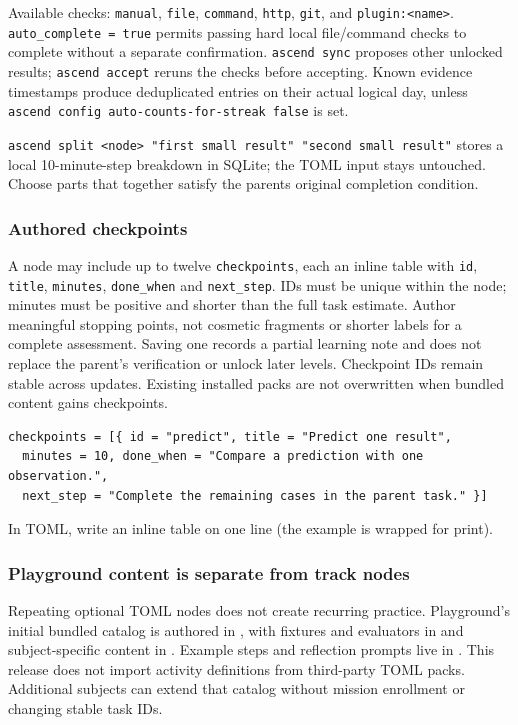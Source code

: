 Available checks: \texttt{manual}, \texttt{file}, \texttt{command},
\texttt{http}, \texttt{git}, and
\texttt{plugin:\textless{}name\textgreater{}}.
\texttt{auto\_complete = true} permits passing hard local file/command
checks to complete without a separate confirmation.
\texttt{ascend sync} proposes other unlocked results;
\texttt{ascend accept} reruns the checks before accepting. Known
evidence timestamps produce deduplicated entries on their actual logical
day, unless \texttt{ascend config auto-counts-for-streak false} is
set.

\texttt{ascend split \textless{}node\textgreater{} "first small result" "second small result"}
stores a local 10-minute-step breakdown in SQLite; the TOML input stays
untouched. Choose parts that together satisfy the
parent\textquotesingle s original completion condition.


\subsubsection{Authored checkpoints}
A node may include up to twelve \texttt{checkpoints}, each an inline table with
\texttt{id}, \texttt{title}, \texttt{minutes}, \texttt{done\_when} and
\texttt{next\_step}. IDs must be unique within the node; minutes must be positive
and shorter than the full task estimate. Author meaningful stopping points, not
cosmetic fragments or shorter labels for a complete assessment. Saving one records
a partial learning note and does not replace the parent's verification or unlock
later levels. Checkpoint IDs remain stable across updates. Existing installed packs
are not overwritten when bundled content gains checkpoints.

\begin{verbatim}
checkpoints = [{ id = "predict", title = "Predict one result",
  minutes = 10, done_when = "Compare a prediction with one observation.",
  next_step = "Complete the remaining cases in the parent task." }]
\end{verbatim}
In TOML, write an inline table on one line (the example is wrapped for print).

\subsubsection{Playground content is separate from track nodes}
Repeating optional TOML nodes does not create recurring practice. Playground's
initial bundled catalog is authored in , with
fixtures and evaluators in  and subject-specific
content in . Example steps and reflection prompts
live in . This release does
not import activity definitions from third-party TOML packs. Additional subjects
can extend that catalog without mission enrollment or changing stable task IDs.

